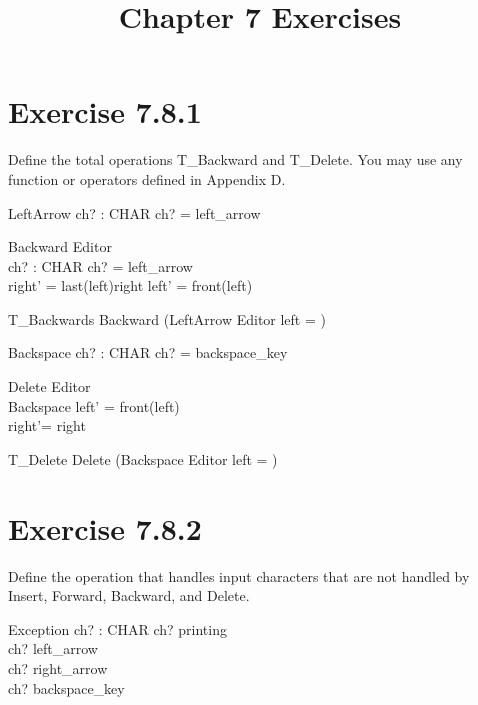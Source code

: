 \documentclass{article}
\title{Chapter 7 Exercises}
\begin{document}
\maketitle

\section{Exercise 7.8.1}
Define the total operations T\_Backward and T\_Delete. You may use any function or operators defined in Appendix D.

\begin{schema}{LeftArrow}
    ch? : CHAR
    \where
    ch? = left\_arrow
\end{schema}

\begin{schema}{Backward}
    \Delta Editor \\
    ch? : CHAR
    \where
    ch? = left\_arrow \\
    right' =  \langle last(left)\rangle \cat right
    left' = front(left)
\end{schema}

\begin{zed}
    T\_Backwards \widehat{=} Backward \vee (LeftArrow \wedge \Xi Editor \wedge left = \langle\rangle)
\end{zed}

\begin{schema}{Backspace}
    ch? : CHAR
\where
    ch? = backspace\_key
\end{schema}

\begin{schema}{Delete}
    \Delta Editor \\
    Backspace
    \where
    left' = front(left) \\
    right'= right
\end{schema}

\begin{zed}
    T\_Delete \widehat{=} Delete \vee (Backspace \wedge \Xi Editor \wedge left = \langle\rangle)
\end{zed}

\section{Exercise 7.8.2}
Define the operation that handles input characters that are not handled by Insert, Forward, Backward, and Delete.

\begin{schema}{Exception}
    ch? : CHAR
    \where
    ch? \notin printing \\
    ch? \neq left\_arrow \\
    ch? \neq right\_arrow \\
    ch? \neq backspace\_key
\end{schema}
\end{document}
